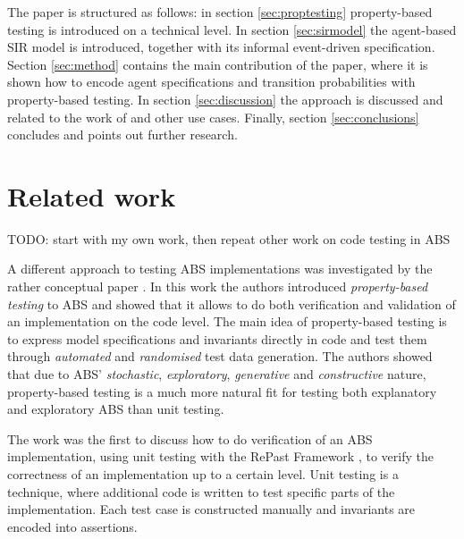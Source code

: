 The paper is structured as follows: in section \ref{sec:proptesting} property-based testing is introduced on a technical level. In section \ref{sec:sirmodel} the agent-based SIR model is introduced, together with its informal event-driven specification. Section \ref{sec:method} contains the main contribution of the paper, where it is shown how to encode agent specifications and transition probabilities with property-based testing. In section \ref{sec:discussion} the approach is discussed and related to the work of \cite{thaler_show_2019} and other use cases. Finally, section \ref{sec:conclusions} concludes and points out further research.

\section{Related work}
TODO: start with my own work, then repeat other work on code testing in ABS

A different approach to testing ABS implementations was investigated by the rather conceptual paper \cite{thaler_show_2019}. In this work the authors introduced \textit{property-based testing} to ABS and showed that it allows to do both verification and validation of an implementation on the code level. The main idea of property-based testing is to express model specifications and invariants directly in code and test them through \textit{automated} and \textit{randomised} test data generation. The authors showed that due to ABS' \textit{stochastic}, \textit{exploratory}, \textit{generative} and \textit{constructive} nature, property-based testing is a much more natural fit for testing both explanatory and exploratory ABS than unit testing. 

The work \cite{collier_test-driven_2013} was the first to discuss how to do verification of an ABS implementation, using unit testing with the RePast Framework \cite{north_complex_2013}, to verify the correctness of an implementation up to a certain level. Unit testing is a technique, where additional code is written to test specific parts of the implementation. Each test case is constructed manually and invariants are encoded into assertions.

